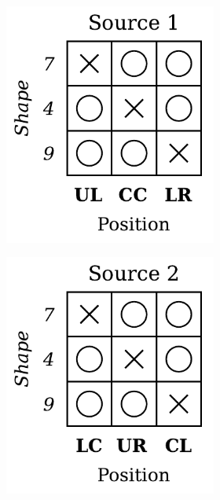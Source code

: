\begin{definition}
\begin{figure}[H]
\begin{subfigure}[b]{0.45\textwidth}
\begin{subfigure}[b]{0.48\textwidth}
                \includegraphics[width=\textwidth]{img/datasets/ZGO_fact=pos_env=0.pdf}
            \end{subfigure}
            \begin{subfigure}[b]{0.48\textwidth}
                \centering
                \includegraphics[width=\textwidth]{img/datasets/ZGO_fact=pos_env=1.pdf}

\end{subfigure}
\end{subfigure}
\end{figure}
\end{definition}
